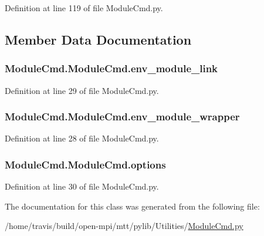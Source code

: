 Definition at line 119 of file Module\-Cmd.\-py.



\subsection{Member Data Documentation}
\hypertarget{classModuleCmd_1_1ModuleCmd_a1b4a34e278600fe59cd55bb0d56baa61}{
\subsubsection[{env\-\_\-module\-\_\-link}]{\setlength{\rightskip}{0pt plus 5cm}Module\-Cmd.\-Module\-Cmd.\-env\-\_\-module\-\_\-link}}\label{classModuleCmd_1_1ModuleCmd_a1b4a34e278600fe59cd55bb0d56baa61}


Definition at line 29 of file Module\-Cmd.\-py.

\hypertarget{classModuleCmd_1_1ModuleCmd_ae60edec82191b5a7a1830495b1ca2e3e}{
\subsubsection[{env\-\_\-module\-\_\-wrapper}]{\setlength{\rightskip}{0pt plus 5cm}Module\-Cmd.\-Module\-Cmd.\-env\-\_\-module\-\_\-wrapper}}\label{classModuleCmd_1_1ModuleCmd_ae60edec82191b5a7a1830495b1ca2e3e}


Definition at line 28 of file Module\-Cmd.\-py.

\hypertarget{classModuleCmd_1_1ModuleCmd_a981a0fc879a722b76faa16b4289ab953}{
\subsubsection[{options}]{\setlength{\rightskip}{0pt plus 5cm}Module\-Cmd.\-Module\-Cmd.\-options}}\label{classModuleCmd_1_1ModuleCmd_a981a0fc879a722b76faa16b4289ab953}


Definition at line 30 of file Module\-Cmd.\-py.



The documentation for this class was generated from the following file\-:\begin{DoxyCompactItemize}
\item 
/home/travis/build/open-\/mpi/mtt/pylib/\-Utilities/\hyperlink{ModuleCmd_8py}{Module\-Cmd.\-py}\end{DoxyCompactItemize}
